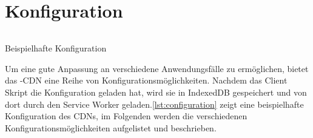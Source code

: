 %



\section{Konfiguration}\label{i:Konfiguration}
\begin{listing}[h]
	\inputminted{javascript}{listings/configuration.js}
	\caption{Beispielhafte Konfiguration}
	\label{lst:configuration}
\end{listing}

Um eine gute Anpassung an verschiedene Anwendungsfälle zu ermöglichen, bietet das \pTp-CDN eine Reihe von Konfigurationsmöglichkeiten. Nachdem das Client Skript die Konfiguration geladen hat, wird sie in IndexedDB gespeichert und von dort durch den Service Worker geladen.\ref{lst:configuration} zeigt eine beispielhafte Konfiguration des CDNs, im Folgenden werden die verschiedenen Konfigurationsmöglichkeiten aufgelistet und beschrieben.

